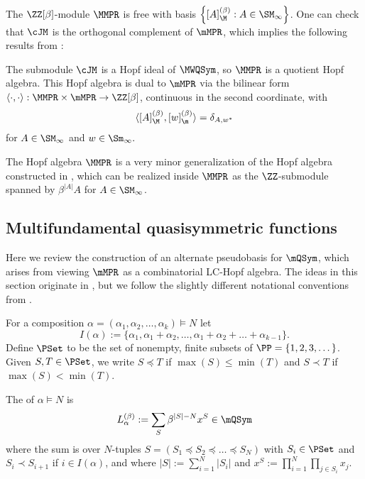The $\ZZ[\beta]$-module $\MMPR$ is free  with 
 basis  $\left\{[A]^{(\beta)}_\M: A \in \SM_\infty\right\}$.
One can check that $\cJM$ is the orthogonal complement of $\mMPR$,
which
implies the following results from \cite[\S7.2 and \S7.4]{LamPyl}:

\begin{theorem}
\label{form2-thm}
The submodule $\cJM$ is a Hopf ideal of $\MWQSym$,
so $\MMPR$ is a quotient Hopf algebra.
This Hopf algebra is dual to $\mMPR$ via 
the bilinear form
$\langle\cdot,\cdot\rangle : \MMPR \times \mMPR\to \ZZ[\beta]$, 
continuous in the second coordinate, with
\[
\langle [A]^{(\beta)}_\M, [w]^{(\beta)}_\m \rangle = \delta_{A,w^*}
\]
for $A \in \SM_\infty$ and $w\in \Sm_\infty.$
\end{theorem}




The Hopf algebra $\MMPR$ is a very minor generalization of the Hopf algebra constructed in \cite[Thm.~7.5]{LamPyl},
which can be realized inside $\MMPR$ as the $\ZZ$-submodule 
spanned by $  \beta^{|A|} A$ for $A \in \SM_\infty$.




 


 

\subsection{Multifundamental quasisymmetric functions}


Here we review the construction   of an alternate pseudobasis for $\mQSym$,
which arises from viewing $\mMPR$ as a combinatorial LC-Hopf algebra.
The ideas in this section originate in \cite[\S5]{LamPyl}, but we follow the slightly different notational
conventions from \cite[\S3]{LM2019}.
 
For a composition $\alpha=(\alpha_1,\alpha_2,\dots,\alpha_k)\vDash N$
let 
\[
I(\alpha) := \{\alpha_1, \alpha_1+\alpha_2,\dots, \alpha_1+\alpha_2 + \dots + \alpha_{k-1}\}
.\]
Define $\PSet$ to be the set of nonempty, finite subsets of $\PP=\{1,2,3,\dots\}$. 
Given $S,T \in \PSet$, we write $S\preceq T$ if $\max(S) \leq \min(T)$ and $S \prec T$ if $\max(S) < \min(T)$.
\begin{definition}
\label{lbeta-def}
The  of $\alpha\vDash N$ is  
\[
 L^{(\beta)}_\alpha   := \sum_S
\beta^{|S| - N} x^S
\in \mQSym
\] where 
the sum is over $N$-tuples $S=(S_1 \preceq S_2 \preceq \dots \preceq S_N)$ with $S_i \in \PSet$
and $S_i \prec S_{i+1}$ if $i \in I(\alpha)$, and where
$|S| := \sum_{i=1}^N |S_i|$ and $x^S := \prod_{i=1}^N \prod_{j \in S_i} x_{j}$.
\end{definition}

